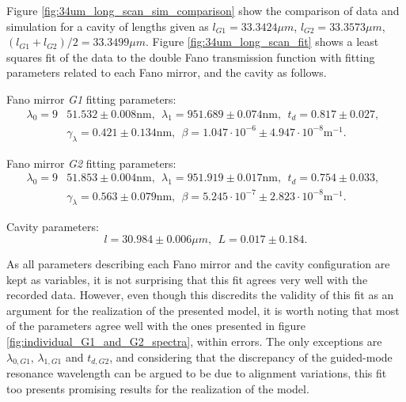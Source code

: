 Figure \ref{fig:34um_long_scan_sim_comparison} show the comparison of data and simulation for a cavity of lengths given as $l_{G1} = 33.3424 \mu m$, $l_{G2} = 33.3573 \mu m$, $(l_{G1} + l_{G2})/2 = 33.3499 \mu m$. Figure \ref{fig:34um_long_scan_fit} shows a least squares fit of the data to the double Fano transmission function with fitting parameters related to each Fano mirror, and the cavity as follows.

Fano mirror \emph{G1} fitting parameters:
\begin{equation}
    \begin{split}
        \lambda_0 = 9&51.532 \pm 0.008 \text{nm}, \:\: \lambda_1 = 951.689 \pm 0.074 \text{nm}, \:\: t_d = 0.817 \pm 0.027, \:\: \\&\gamma_{\lambda} = 0.421 \pm 0.134 \text{nm}, \:\: \beta = 1.047 \cdot 10^{-6} \pm 4.947 \cdot 10^{-8} \text{m}^{-1}.
    \end{split}
\end{equation}

Fano mirror \emph{G2} fitting parameters:
\begin{equation}
    \begin{split}
        \lambda_0 = 9&51.853 \pm 0.004 \text{nm}, \:\: \lambda_1 = 951.919 \pm 0.017 \text{nm}, \:\: t_d = 0.754 \pm 0.033, \:\: \\&\gamma_{\lambda} = 0.563 \pm 0.079 \text{nm}, \:\: \beta = 5.245 \cdot 10^{-7} \pm 2.823 \cdot 10^{-8} \text{m}^{-1}.
    \end{split}
\end{equation}

Cavity parameters:
\begin{equation}
    l = 30.984 \pm 0.006 \mu m, \:\: L = 0.017 \pm 0.184.
\end{equation}

As all parameters describing each Fano mirror and the cavity configuration are kept as variables, it is not surprising that this fit agrees very well with the recorded data. However, even though this discredits the validity of this fit as an argument for the realization of the presented model, it is worth noting that most of the parameters agree well with the ones presented in figure \ref{fig:individual_G1_and_G2_spectra}, within errors. The only exceptions are $\lambda_{0,G1}$, $\lambda_{1,G1}$ and $t_{d,G2}$, and considering that the discrepancy of the guided-mode resonance wavelength can be argued to be due to alignment variations, this fit too presents promising results for the realization of the model.

